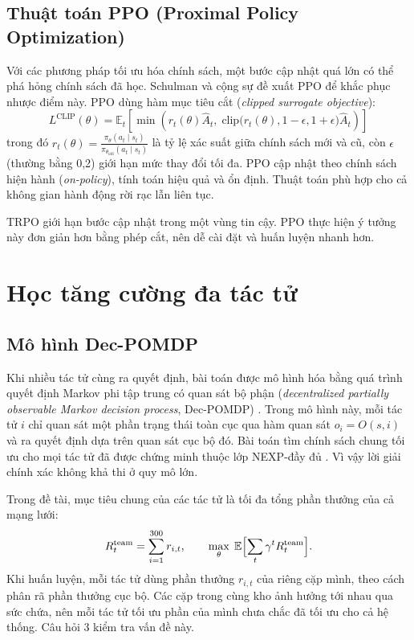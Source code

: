 \subsection{Thuật toán PPO (Proximal Policy Optimization)}
\label{subsec:ppo}

Với các phương pháp tối ưu hóa chính sách, một bước cập nhật quá lớn có thể phá hỏng chính sách đã học. Schulman và cộng sự \cite{schulman2017ppo} đề xuất PPO để khắc phục nhược điểm này. PPO dùng hàm mục tiêu cắt (\textit{clipped surrogate objective}):
\begin{equation}
    L^{\text{CLIP}}(\theta) = \mathbb{E}_t \left[ \min\!\left(
    r_t(\theta) \hat{A}_t, \;
    \text{clip}\bigl(r_t(\theta), 1 - \epsilon, 1 + \epsilon\bigr) \hat{A}_t
    \right) \right]
    \label{eq:ppoclip}
\end{equation}
trong đó $r_t(\theta) = \frac{\pi_\theta(a_t \mid s_t)}{\pi_{\theta_{\text{old}}}(a_t \mid s_t)}$ là tỷ lệ xác suất giữa chính sách mới và cũ, còn $\epsilon$ (thường bằng 0,2) giới hạn mức thay đổi tối đa. PPO cập nhật theo chính sách hiện hành (\textit{on-policy}), tính toán hiệu quả và ổn định. Thuật toán phù hợp cho cả không gian hành động rời rạc lẫn liên tục.

TRPO \parencite{schulman2015trpo} giới hạn bước cập nhật trong một vùng tin cậy. PPO thực hiện ý tưởng này đơn giản hơn bằng phép cắt, nên dễ cài đặt và huấn luyện nhanh hơn.

\section{Học tăng cường đa tác tử}
\label{sec:marl}

\subsection{Mô hình Dec-POMDP}
\label{subsec:decPomdp}

Khi nhiều tác tử cùng ra quyết định, bài toán được mô hình hóa bằng quá trình quyết định Markov phi tập trung có quan sát bộ phận (\textit{decentralized partially observable Markov decision process}, Dec-POMDP) \parencite{oliehoek2016}. Trong mô hình này, mỗi tác tử $i$ chỉ quan sát một phần trạng thái toàn cục qua hàm quan sát $o_i = O(s, i)$ và ra quyết định dựa trên quan sát cục bộ đó. Bài toán tìm chính sách chung tối ưu cho mọi tác tử đã được chứng minh thuộc lớp NEXP-đầy đủ \parencite{bernstein2002}. Vì vậy lời giải chính xác không khả thi ở quy mô lớn.

Trong đề tài, mục tiêu chung của các tác tử là tối đa tổng phần thưởng của cả mạng lưới:
\begin{equation}
    R_t^{\text{team}} = \sum_{i=1}^{300} r_{i,t},
    \qquad
    \max_{\theta}\; \mathbb{E}\Bigl[\sum_{t} \gamma^{t} R_t^{\text{team}}\Bigr].
    \label{eq:mucTieuDoi}
\end{equation}
Khi huấn luyện, mỗi tác tử dùng phần thưởng $r_{i,t}$ của riêng cặp mình, theo cách phân rã phần thưởng cục bộ. Các cặp trong cùng kho ảnh hưởng tới nhau qua sức chứa, nên mỗi tác tử tối ưu phần của mình chưa chắc đã tối ưu cho cả hệ thống. Câu hỏi 3 kiểm tra vấn đề này.

